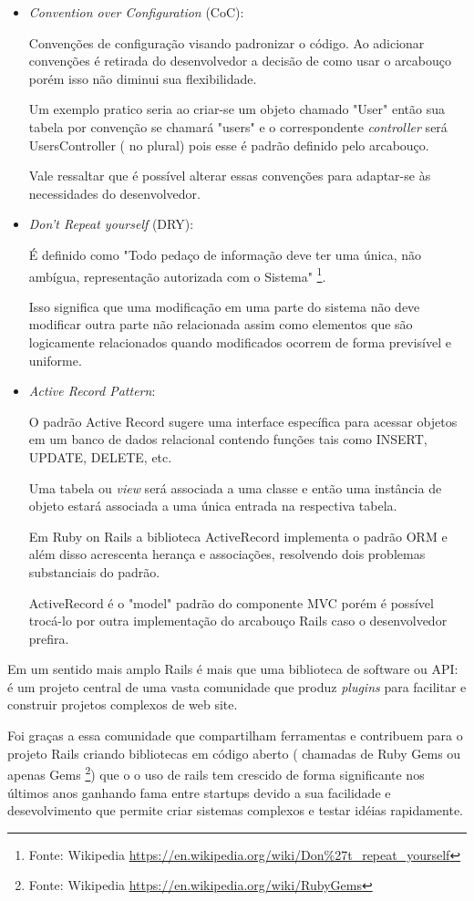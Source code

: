 \begin{itemize}
\item {\emph{Convention over Configuration} (CoC):}
    \par Convenções de configuração visando padronizar o código. Ao adicionar convenções é retirada do desenvolvedor a decisão de como usar o arcabouço porém isso não diminui sua flexibilidade.
    \par Um exemplo pratico seria ao criar-se um objeto chamado "User" então sua tabela por convenção se chamará "users" e o correspondente \emph{controller} será UsersController ( no plural) pois esse é padrão definido pelo arcabouço.
    \par Vale ressaltar que é possível alterar essas convenções para adaptar-se às necessidades do desenvolvedor.

\item {\emph{Don't Repeat yourself} (DRY):}
    \par É definido como "Todo pedaço de informação deve ter uma única, não ambígua, representação autorizada com o Sistema" \footnote{Fonte: Wikipedia \url{https://en.wikipedia.org/wiki/Don\%27t_repeat_yourself}}.
    \par Isso significa que uma modificação em uma parte do sistema não deve modificar outra parte não relacionada assim como elementos que são logicamente relacionados quando modificados ocorrem de forma previsível e uniforme.

\item { \emph{Active Record Pattern}:}
    \par O padrão Active Record sugere uma interface específica para acessar objetos em um banco de dados relacional contendo funções tais como INSERT, UPDATE, DELETE, etc.
    \par Uma tabela ou \emph{view} será associada a uma classe e então uma instância de objeto estará associada a uma única entrada na respectiva tabela.
    \par Em Ruby on Rails a biblioteca ActiveRecord implementa o padrão ORM e além disso acrescenta herança e associações, resolvendo dois problemas substanciais do padrão.
    \par ActiveRecord é o "model" padrão do componente MVC porém é possível trocá-lo por outra implementação do arcabouço Rails caso o desenvolvedor prefira.
\end{itemize}
    \par Em um sentido mais amplo Rails é mais que uma biblioteca de software ou API: é um projeto central de uma vasta comunidade que produz \emph{plugins} para facilitar e construir projetos complexos de web site.
    \par Foi graças a essa comunidade que compartilham ferramentas e contribuem para o projeto Rails criando bibliotecas em código aberto ( chamadas de Ruby Gems ou apenas Gems \footnote{Fonte: Wikipedia \url{https://en.wikipedia.org/wiki/RubyGems}}) que o o uso de rails tem crescido de forma significante nos últimos anos ganhando fama entre startups devido a sua  facilidade e desevolvimento que permite criar sistemas complexos e testar idéias rapidamente.

